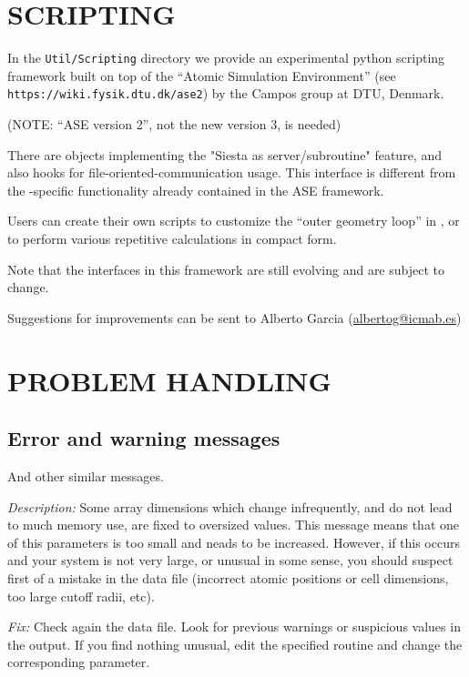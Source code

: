 \section{SCRIPTING}

In the \texttt{Util/Scripting} directory we provide an experimental
python scripting framework built on top of the ``Atomic Simulation
Environment'' (see \texttt{https://wiki.fysik.dtu.dk/ase2}) by the Campos
group at DTU, Denmark.

(NOTE: ``ASE version 2'', not the new version 3, is needed)

There are objects implementing the "Siesta as server/subroutine" feature, and
also hooks for file-oriented-communication usage. This interface is
different from the \siesta-specific functionality already
contained in the ASE framework.

Users can create their own scripts to customize the ``outer geometry loop''
in \siesta, or to perform various repetitive calculations in compact form.

Note that the interfaces in this framework are still evolving and are
subject to change.

Suggestions for improvements can be sent to Alberto Garcia
(\href{mailto:albertog@icmab.es}{albertog@icmab.es})

\section{PROBLEM HANDLING}

\subsection{Error and warning messages}

\begin{description}
\itemsep 10pt
\parsep 0pt

\item[\texttt{chkdim: ERROR: In \textit{routine} dimension \textit{parameter} =
\textit{value}. It must be  ...}]

And other similar messages.

\textit{Description:} Some array dimensions which change infrequently,
and do not lead to much memory use, are fixed to oversized
values. This message means that one of this parameters is too small
and neads to be increased.  However, if this occurs and your system is
not very large, or unusual in some sense, you should suspect first of
a mistake in the data file (incorrect atomic positions or cell
dimensions, too large cutoff radii, etc).

\textit{Fix:} Check again the data file.  Look for previous warnings or
suspicious values in the output.  If you find nothing unusual, edit
the specified routine and change the corresponding parameter.  

\end{description}



